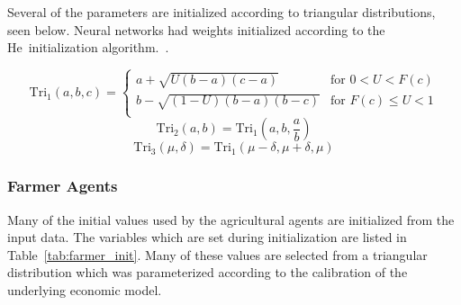 Several of the parameters are initialized according 
to triangular distributions, seen below.
Neural networks had weights initialized according to the He~initialization
algorithm.~\cite{he2004initialization}.

\newcommand{\Tri}[0]{\text{Tri}}

\begin{equation}
\label{eq:tri}
    \Tri_1\left(a, b, c\right)
    = \left\{
    \begin{array}{ll}
    a + \sqrt{U (b - a) (c - a)} & \text{for } 0 < U < F(c) \\
    b - \sqrt{(1 - U) (b - a) (b - c)} & \text{for } F(c) \le U < 1 \\
    \end{array}
    \right.
\end{equation}
\begin{equation}
    \Tri_2\left(a, b\right) = 
    \Tri_1\left(a, b, \frac{a}{b}\right)
\end{equation}
\begin{equation}
    \Tri_3\left(\mu, \delta\right) = 
    \Tri_1\left(\mu-\delta, \mu+\delta, \mu\right)
\end{equation}

\subsubsection{Farmer Agents}
\label{sec:farmer_init}
Many of the initial values used by the agricultural agents are initialized
from the input data.
The variables which are set during initialization are listed in
Table~\ref{tab:farmer_init}.
Many of these values are selected from a triangular distribution
which was parameterized according to the calibration of the
underlying economic model.

